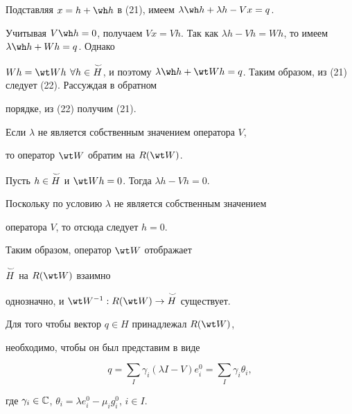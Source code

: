  


\begin{pf} 


Подставляя $x=h+\wh h$ в (21), имеем $\lambda\wh h+\lambda h-V x=q$. 


Учитывая $V\wh h=0$, получаем $V x=V h$. Так как $\lambda h-V h=W 


h$, то имеем $\lambda\wh h+W h=q$. Однако 


$W h=\wt W h$ $\forall h\in\up{\smile}{H}$, и поэтому $\lambda\wh h+\wt W 


h=q$. Таким образом, из (21) следует (22). Рассуждая в обратном 


порядке, из (22) получим (21). 


\end{pf} 


 


\begin{lem} 


Если $\lambda$ не является собственным значением оператора $V$, 


то оператор $\wt W$ обратим на $R(\wt W)$. 


\end{lem} 


 


\begin{pf} 


Пусть $h\in\overset{\,\smile}{H}{}$ и $\wt Wh=0$. Тогда $\lambda h-V h=0$. 


Поскольку по условию $\lambda$ не является собственным значением 


оператора $V$, то отсюда следует $h=0$. 


 


Таким образом, оператор $\wt W$ отображает 


$\overset{\,\smile}{H}{}$ на $R(\wt W)$ взаимно 


однозначно, и $\wt W^{-1}:R(\wt W)\to\up{\smile}{H}$ существует. 


\end{pf} 


 


\begin{lem} 


Для того чтобы вектор $q\in H$ принадлежал $R(\wt W)$,


необходимо, чтобы он был представим в виде 


\begin{equation} 


q=\sum_I \gamma_i(\lambda I-V)e^0_i= 


\sum_I \gamma_i\theta_i, 


\end{equation} 


где $\gamma_i\in\Bbb C$, $\theta_i=\lambda e^0_i-\mu_i g^0_i$, $i\in I$. 


\end{lem} 


